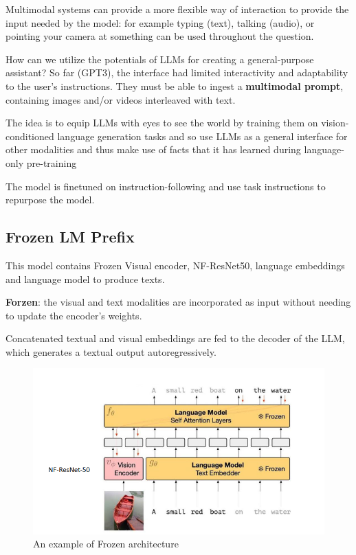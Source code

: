 Multimodal systems can provide a more flexible way of interaction to provide the input needed by the model: for example typing (text), talking (audio), or pointing your camera at something can be used throughout the question.

How can we utilize the potentials of LLMs for creating a general-purpose assistant? So far (GPT3), the interface had limited interactivity and adaptability to the user’s
instructions. They must be able to ingest a \textbf{multimodal prompt},  containing images and/or videos interleaved with text.

The idea is to equip LLMs with eyes to see the world by training them on vision-conditioned language generation tasks and so use LLMs as a general interface for other modalities and thus make use of facts that it has learned during language-only pre-training

The model is finetuned on instruction-following and use task instructions to
repurpose the model.

\subsection{Frozen LM Prefix}

This model contains Frozen Visual encoder,  NF-ResNet50, language embeddings and language model to produce texts.

\textbf{Forzen}: the visual and text modalities are incorporated as input without needing to update the encoder's weights. 

Concatenated textual and visual embeddings are fed to the decoder of the LLM, which generates a textual output autoregressively.

\begin{figure}[H]
    \centering
    \includegraphics[width=1\linewidth]{tikz/Flamingo 1.png}
    \caption{An example of Frozen architecture}
    \label{fig:Frozen}
\end{figure}

